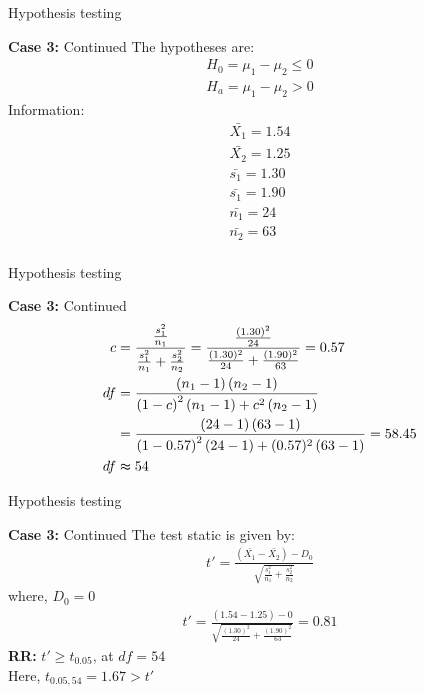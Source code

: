 \documentclass{beamer}
\begin{document}
\begin{frame}{Hypothesis testing}

    \begin{block}{\textbf{Case 3:} Continued}
        The hypotheses are:
        \begin{align}
            H_0 = \mu_1 - \mu_2 \leq 0 \\
            H_a = \mu_1 - \mu_2 > 0
        \end{align}
        Information:
        \begin{align}
            \bar{X_1} = 1.54 \\
            \bar{X_2} = 1.25 \\
            \bar{s_1} = 1.30 \\
            \bar{s_1} = 1.90 \\
            \bar{n_1} = 24 \\
            \bar{n_2} = 63 \\
        \end{align}

    \end{block}
\end{frame}


\begin{frame}{Hypothesis testing}

    \begin{block}{\textbf{Case 3:} Continued}
        \begin{align}
            c  & = \frac{\frac{s_1^2}{n_1}}{\frac{s_1^2}{n_1} +
            \frac{s_2^2}{n_2}} = \frac{\frac{(1.30)^2}{24}}{\frac{(1.30)^2}{24} + \frac{(1.90)^2}{63}} = 0.57 \\
            df & =
            \frac{\left(n_1-1\right)\left(n_2-1\right)}{\left(1-c\right)^2 \left(n_1-1\right) + c^2 \left(n_2-1\right)} \\
             &=   \frac{\left(24-1\right)\left(63-1\right)}{\left(1-0.57\right)^2 \left(24-1\right) + (0.57)^2 \left(63-1\right)} = 58.45 \\
             df & \thickapprox  54
        \end{align}
    \end{block}

\end{frame}

\begin{frame}{Hypothesis testing}
    \begin{block}{\textbf{Case 3:} Continued}
        The test static is given by:
        \begin{align}
            t' = \frac{\left(\bar{X_1}-\bar{X_2}\right) - D_0} {\sqrt{\frac{s_1^2}{n_1} + \frac{s_2^2}{n_2}}} 
        \end{align}
        where, $D_0 = 0$\\
        \begin{align}
            t' = \frac{\left(1.54-1.25\right) - 0} {\sqrt{{\frac{(1.30)^2}{24} + \frac{(1.90)^2}{63}}}}  = 0.81
        \end{align}
        \textbf{RR:} $ t' \geq t_{0.05} $, at $df = 54$ \\
        Here, $t_{0.05,54} = 1.67 > t'$ 
    \end{block}
\end{frame}
\end{document}
